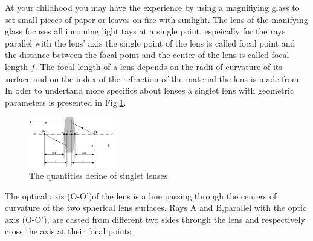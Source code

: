 At your childhood you may have the experience by using a magnifiying glass to set small pieces of paper or leaves on fire with sunlight. The lens of the manifying glass focuses all incoming light tays at a single point. espeically for the rays parallel with the lens' axis the single point of the lens is called focal point and the distance between the focal point and the center of the lens is called focal length $f$.
The focal length of a lens depends on the radii of curvature of its surface and on the index of the refraction of the material the lens is made from. In oder to undertand more specifics about lenses a singlet lens with geometric parameters is presented in Fig.\ref{fig:lens_define}.

\begin{figure}[httbp]
\centering
\includegraphics[width=0.33\textwidth]{bilder/lens_define}
\caption{The quantities define of singlet lenses}
\label{fig:lens_define}
\end{figure}
The optical axis (O-O')of the lens is a line passing through the centers of curvature of the two spherical lens surfaces. 
Rays A and B,parallel with the optic axis (O-O'), are  casted from different two sides through the lens and respectively cross the axis at their focal points. 


